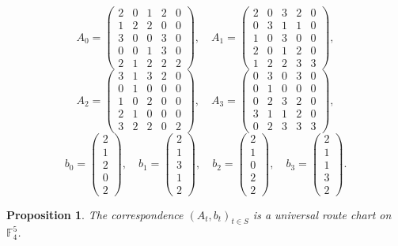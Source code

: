 \documentclass[11pt]{article}
\newtheorem{proposition}[theorem]{Proposition}
\theoremstyle{definition}
\theoremstyle{remark}
\renewcommand{\_}{\textunderscore\allowbreak}
\begin{document}
\[
A_0=\begin{pmatrix}
2&0&1&2&0\\
1&2&2&0&0\\
3&0&0&3&0\\
0&0&1&3&0\\
2&1&2&2&2
\end{pmatrix},\quad
A_1=\begin{pmatrix}
2&0&3&2&0\\
0&3&1&1&0\\
1&0&3&0&0\\
2&0&1&2&0\\
1&2&2&3&3
\end{pmatrix},
\] \[
A_2=\begin{pmatrix}
3&1&3&2&0\\
0&1&0&0&0\\
1&0&2&0&0\\
2&1&0&0&0\\
3&2&2&0&2
\end{pmatrix},\quad
A_3=\begin{pmatrix}
0&3&0&3&0\\
0&1&0&0&0\\
0&2&3&2&0\\
3&1&1&2&0\\
0&2&3&3&3
\end{pmatrix},
\] \[
b_0=\begin{pmatrix}2\\1\\2\\0\\2\end{pmatrix},\quad
b_1=\begin{pmatrix}2\\1\\3\\1\\2\end{pmatrix},\quad
b_2=\begin{pmatrix}2\\1\\0\\2\\2\end{pmatrix},\quad
b_3=\begin{pmatrix}2\\1\\1\\3\\2\end{pmatrix}.
\]

\begin{proposition}\label{prop:a11}
The correspondence \((A_t,b_t)_{t\in S}\) is
a universal route chart on \(\mathbb F_4^5\).
\end{proposition}
\end{document}
